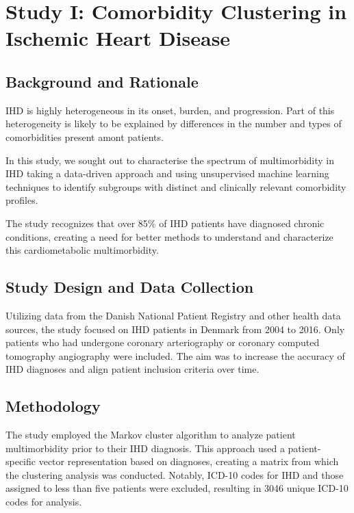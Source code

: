 \chapter{Study I: Comorbidity Clustering in Ischemic Heart Disease}
\label{outline-study-1}


\section{Background and Rationale}

\ac{IHD} is highly heterogeneous in its onset, burden, and progression.
Part of this heterogeneity is likely to be explained by differences in 
the number and types of comorbidities present amont patients.

In this study, we sought out to characterise the spectrum of multimorbidity
in \ac{IHD} taking a data-driven approach and using unsupervised
machine learning techniques to identify subgroups with distinct and clinically
relevant comorbidity profiles.

The study recognizes that over 85\% of \ac{IHD} patients have diagnosed chronic
conditions, creating a need for better methods to understand and characterize
this cardiometabolic multimorbidity.




\section{Study Design and Data Collection}

Utilizing data from the Danish National Patient Registry and other health data sources, the study focused on IHD patients in Denmark from 2004 to 2016. 
Only patients who had undergone coronary arteriography or coronary computed
tomography angiography were included. 
The aim was to increase the accuracy of IHD diagnoses and align patient
inclusion criteria over time.

\section{Methodology}

The study employed the Markov cluster algorithm to analyze patient 
multimorbidity prior to their IHD diagnosis. 
This approach used a patient-specific vector representation based on diagnoses, 
creating a matrix from which the clustering analysis was conducted. 
Notably, ICD-10 codes for IHD and those assigned to less than five patients were excluded, resulting in 3046 unique ICD-10 codes for analysis.




